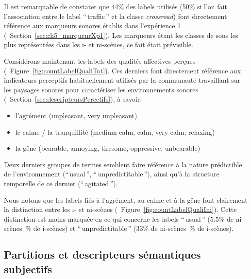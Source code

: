 Il est remarquable de constater que 44\% des labels utilisés (50\% si l'on fait l'association entre le label ``\,traffic\,'' et la classe \emph{crossroad}) font directement référence aux marqueurs sonores établis dans l'expérience 1 (\cf~Section~\ref{sec:ch5_marqueurXp1}). Les marqueurs étant les classes de sons les plus représentées dans les i- et ni-scènes, ce fait était prévisible.

Considérons maintenant les labels des qualités affectives perçues (\cf~Figure~\ref{fig:countLabelQualiTot}). Ces derniers font directement  référence aux indicateurs perceptifs habituellement utilisés par la communauté travaillant sur les paysages sonores pour caractériser les environnements sonores (\cf~Section~\ref{sec:descripteursPercetifs}), à savoir:

\begin{itemize}
\item l'agrément (unpleasant, very unpleasant)
\item le calme / la tranquillité (medium calm, calm, very calm, relaxing)
\item la gêne (bearable, annoying, tiresome, oppressive, unbearable)
\end{itemize}

Deux derniers groupes de termes semblent faire référence à la nature prédictible de l'environnement (``\,usual\,'', ``\,unpredictitable\,''), ainsi qu'à la structure temporelle de ce dernier (``\,agitated\,''). 

Nous notons que les labels liés à l'agrément, au calme et à la gêne font clairement la distinction entre les i- et ni-scènes (\cf~Figure~\ref{fig:countLabelQualiIni}). Cette distinction est moins marquée en ce qui concerne les labels ``\,usual\,'' (5.5\% de ni-scènes~\% de i-scènes) et ``\,unpredictitable\,'' (33\% de ni-scènes~\% de i-scènes).

\subsection{Partitions et descripteurs sémantiques subjectifs}

